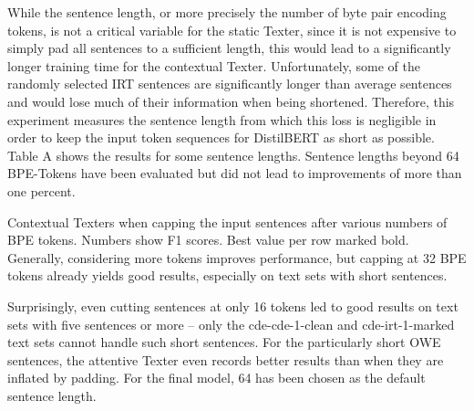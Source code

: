 While the sentence length, or more precisely the number of byte pair encoding tokens, is not a critical variable for the static Texter, since it is not expensive to simply pad all sentences to a sufficient length, this would lead to a significantly longer training time for the contextual Texter. Unfortunately, some of the randomly selected IRT sentences are significantly longer than average sentences and would lose much of their information when being shortened. Therefore, this experiment measures the sentence length from which this loss is negligible in order to keep the input token sequences for DistilBERT as short as possible. Table A shows the results for some sentence lengths. Sentence lengths beyond 64 BPE-Tokens have been evaluated but did not lead to improvements of more than one percent.

\begin{table}[t]
    \centering
    
    \caption{Contextual Texters when capping the input sentences after various numbers of BPE tokens. Numbers show F1 scores. Best value per row marked bold. Generally, considering more tokens improves performance, but capping at 32 BPE tokens already yields good results, especially on text sets with short sentences.}
    \label{tab:5_experiments/3_texter/3_context/1_sent_len/grid_search}
\end{table}

Surprisingly, even cutting sentences at only 16 tokens led to good results on text sets with five sentences or more -- only the cde-cde-1-clean and cde-irt-1-marked text sets cannot handle such short sentences. For the particularly short OWE sentences, the attentive Texter even records better results than when they are inflated by padding. For the final model, 64 has been chosen as the default sentence length.
